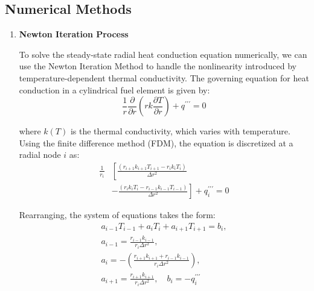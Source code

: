 \documentclass[12pt]{article}
\begin{document}
\begin{multicols}{2}

\section{Numerical Methods}

\begin{enumerate}
    \item \textbf{Newton Iteration Process}

    To solve the steady-state radial heat conduction equation numerically, we can use the Newton Iteration Method to handle the nonlinearity introduced by temperature-dependent thermal conductivity. The governing equation for heat conduction in a cylindrical fuel element is given by:
    \begin{equation}\label{eq:27}
        \frac{1}{r}\frac{\partial}{\partial r}\!\left(r k\frac{\partial T}{\partial r}\right)\!+\!q^{\prime \prime \prime} = 0
    \end{equation}

    where $k(T)$ is the thermal conductivity, which varies with temperature. Using the finite difference method (FDM), the equation is discretized at a radial node $\textit{i}$ as:
    \begin{equation}\label{eq:28}
        \begin{split}
            \frac{1}{r_{i}} & \left[\frac{(r_{i+1}k_{i+1}T_{i+1}-r_{i}k_{i}T_{i})}{\Delta r^{2}} \right. \\ 
            & \left. -\frac{(r_{i}k_{i}T_{i}-r_{i-1}k_{i-1}T_{i-1})}{\Delta r^{2}}\right] 
            +q_{i}^{\prime \prime \prime}=0
        \end{split}
    \end{equation}

    Rearranging, the system of equations takes the form:
    \begin{equation}\label{eq:29}
        \begin{array}{c}
            a_{i-1}T_{i-1} + a_{i}T_{i} + a_{i+1}T_{i+1} = b_{i}, \\[8pt]
            a_{i-1} = \frac{r_{i-1}k_{i-1}}{r_{i}\Delta r^{2}}, \\[8pt]
            a_{i} = -\left(\frac{r_{i+1}k_{i+1} + r_{i-1}k_{i-1}}{r_{i}\Delta r^{2}}\right), \\[8pt]
            a_{i+1} = \frac{r_{i+1}k_{i+1}}{r_{i}\Delta r^{2}}, \quad 
            b_{i} = -q_{i}^{\prime \prime \prime}
        \end{array}
    \end{equation}


\end{enumerate}
\end{multicols}
\end{document}
